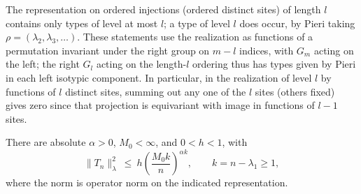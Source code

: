The representation on ordered injections (ordered distinct sites) of length \(l\) contains only types of level at most \(l\); a type of level \(l\) does occur, by Pieri taking \(\rho=(\lambda_2,\lambda_3,\ldots)\). These statements use the realization as functions of a permutation invariant under the right group on \(m-l\) indices, with \(G_m\) acting on the left; the right \(G_l\) acting on the length-\(l\) ordering thus has types given by Pieri in each left isotypic component. In particular, in the realization of level \(l\) by functions of \(l\) distinct sites, summing out any one of the \(l\) sites (others fixed) gives zero since that projection is equivariant with image in functions of \(l-1\) sites.
\begin{proposition}\label{tra:projection-deletion:level}
\label{tra:projection-deletion:level-statement}
There are absolute \(\alpha>0\), \(M_0<\infty\), and \(0<h<1\), with
\begin{equation}
\|T_n\|_\lambda^2\ \le\ h\left(\frac{M_0 k}{n}\right)^{\alpha k}, \qquad k=n-\lambda_1\ge 1,
\label{tra:projection-deletion:eq3}
\end{equation}
where the norm is operator norm on the indicated representation.
\end{proposition}
